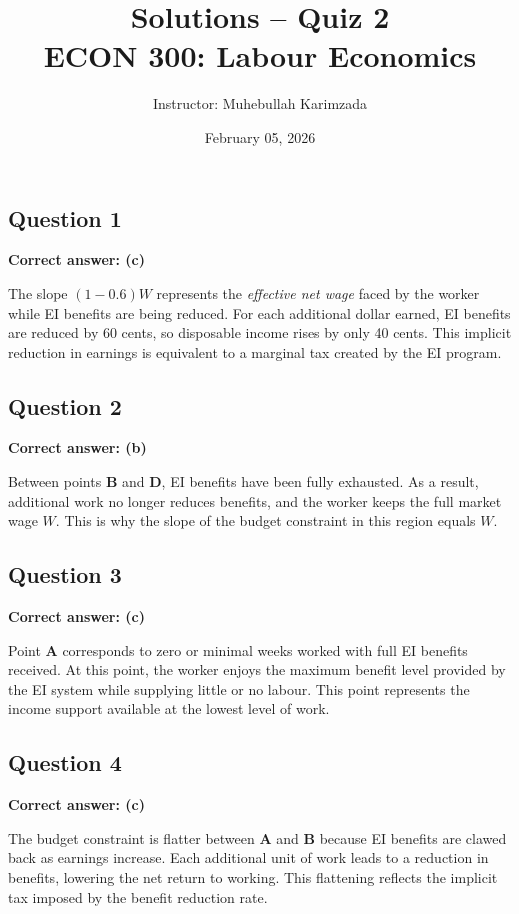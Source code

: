 \documentclass[11pt]{article}
\title{\textbf{Solutions -- Quiz 2} \vspace{ 0.4cm }\\ECON 300: Labour Economics}
\author{Instructor: Muhebullah Karimzada}
\date{February 05,  2026}
\begin{document}
\maketitle




\subsection*{Question 1}

\textbf{Correct answer: (c)}

The slope \( (1-0.6)W \) represents the \emph{effective net wage} faced by the worker while EI benefits are being reduced.  
For each additional dollar earned, EI benefits are reduced by 60 cents, so disposable income rises by only 40 cents.  
This implicit reduction in earnings is equivalent to a marginal tax created by the EI program.



\subsection*{Question 2}

\textbf{Correct answer: (b)}

Between points \textbf{B} and \textbf{D}, EI benefits have been fully exhausted.  
As a result, additional work no longer reduces benefits, and the worker keeps the full market wage \(W\).  
This is why the slope of the budget constraint in this region equals \(W\).



\subsection*{Question 3}

\textbf{Correct answer: (c)}

Point \textbf{A} corresponds to zero or minimal weeks worked with full EI benefits received.  
At this point, the worker enjoys the maximum benefit level provided by the EI system while supplying little or no labour.  
This point represents the income support available at the lowest level of work.



\subsection*{Question 4}

\textbf{Correct answer: (c)}

The budget constraint is flatter between \textbf{A} and \textbf{B} because EI benefits are clawed back as earnings increase.  
Each additional unit of work leads to a reduction in benefits, lowering the net return to working.  
This flattening reflects the implicit tax imposed by the benefit reduction rate.
\end{document}

